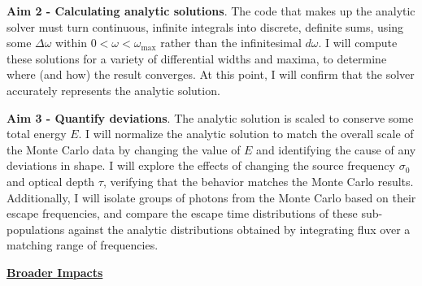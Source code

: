 \documentclass[11pt]{article}
\begin{document}
\noindent \textbf{Aim 2 - Calculating analytic solutions}. The code that makes up the analytic solver must turn continuous, infinite integrals into discrete, definite sums, using some $\Delta \omega$ within $0 < \omega < \omega_{\mathrm{max}}$ rather than the infinitesimal $d\omega$. I will compute these solutions for a variety of differential widths and maxima, to determine where (and how) the result converges. At this point, I will confirm that the solver accurately represents the analytic solution. 

\noindent \textbf{Aim 3 - Quantify deviations}. The analytic solution is scaled to conserve some total energy $E$. I will normalize the analytic solution to match the overall scale of the Monte Carlo data by changing the value of $E$ and identifying the cause of any deviations in shape. I will explore the effects of changing the source frequency $\sigma_0$ and optical depth $\tau$, verifying that the behavior matches the Monte Carlo results. Additionally, I will isolate groups of photons from the Monte Carlo based on their escape frequencies, and compare the escape time distributions of these sub-populations against the analytic distributions obtained by integrating flux over a matching range of frequencies.

\noindent \textbf{\underline{Broader Impacts}} 
\end{document}
